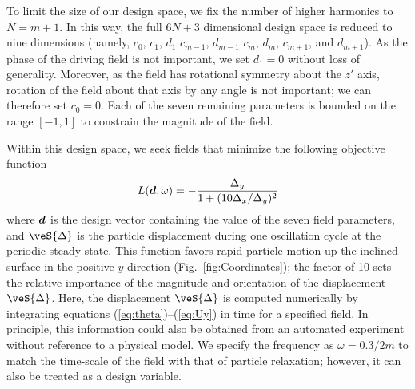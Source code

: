 To limit the size of our design space, we fix the number of higher harmonics to $N=m+1$. In this way, the full $6N+3$ dimensional design space is reduced to nine dimensions (namely, $c_0$, $c_1$, $d_1$ $c_{m-1}$, $d_{m-1}$ $c_{m}$, $d_{m}$, $c_{m+1}$, and $d_{m+1}$). As the phase of the driving field is not important, we set $d_1=0$ without loss of generality. Moreover, as the field has rotational symmetry about the $z'$ axis, rotation of the field about that axis by any angle is not important; we can therefore set $c_{0}=0$. Each of the seven remaining parameters is bounded on the range $[-1,1]$ to constrain the magnitude of the field. 

Within this design space, we seek fields that minimize the following objective function
\begin{equation}
    L(\boldsymbol{d},\omega) = -\frac{\Delta_y}{1 + (10 \Delta_x/\Delta_y)^2} \label{eq:objective}
\end{equation}
where $\boldsymbol{d}$ is the design vector containing the value of the seven field parameters, and $\veS{\Delta}$ is the particle displacement during one oscillation cycle at the periodic steady-state.  This function favors rapid particle motion up the inclined surface in the positive $y$ direction (Fig.~\ref{fig:Coordinates}); the factor of 10 sets the relative importance of the magnitude and orientation of the displacement $\veS{\Delta}$. Here, the displacement $\veS{\Delta}$ is computed numerically by integrating equations (\ref{eq:theta})--(\ref{eq:Uy}) in time for a specified field. In principle, this information could also be obtained from an automated experiment without reference to a physical model. We specify the frequency as $\omega=0.3/2 m$ to match the time-scale of the field with that of particle relaxation; however, it can also be treated as a design variable. 

